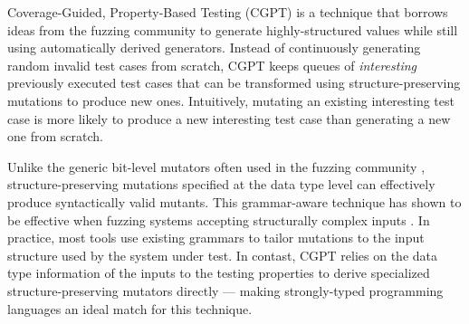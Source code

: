 \documentclass[sigconf,review,anonymous]{acmart}
\newcommand{\quickcheck}{\textit{QuickCheck}\xspace}
\newcommand{\quickchick}{\textit{QuickChick}\xspace}
\newcommand{\fuzzchick}{\textit{FuzzChick}\xspace}
\begin{document}
%
Coverage-Guided, Property-Based Testing (CGPT) \cite{lampropoulos2019coverage}
is a technique that borrows ideas from the fuzzing community to generate
highly-structured values while still using automatically derived generators.
%
%
Instead of continuously generating random invalid test cases from scratch, CGPT
keeps queues of \emph{interesting} previously executed test cases that can be
transformed using structure-preserving mutations to produce new ones.
%
%
Intuitively, mutating an existing interesting test case is more likely to
produce a new interesting test case than generating a new one from scratch.


Unlike the generic bit-level mutators often used in the fuzzing community
\cite{}, structure-preserving mutations specified at the data type level can
effectively produce syntactically valid mutants. 
%
%
This grammar-aware technique has shown to be effective when fuzzing systems
accepting structurally complex inputs \cite{holler2012fuzzing, wang2019superion,
xsmith}.
%
In practice, most tools use existing grammars to tailor mutations to the input
structure used by the system under test. 
%
%
%
%
In contast, CGPT relies on the data type information of the inputs to the
testing properties to derive specialized structure-preserving mutators directly
--- making strongly-typed programming languages an ideal match for this
technique.
%
%
%
%
\end{document}
